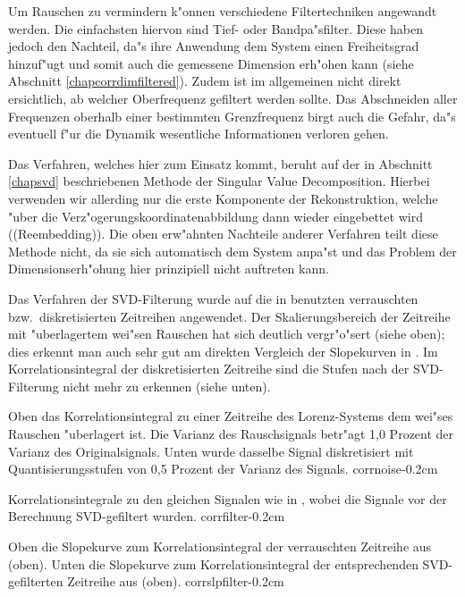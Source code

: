 Um Rauschen zu vermindern k"onnen verschiedene Filtertechniken angewandt werden. Die
einfachsten hiervon sind Tief- oder Bandpa"sfilter. Diese haben jedoch den Nachteil, da"s
ihre Anwendung dem System einen Freiheitsgrad hinzuf"ugt und somit auch die gemessene
Dimension erh"ohen kann (siehe Abschnitt \ref{chapcorrdimfiltered}). Zudem ist im
allgemeinen nicht direkt ersichtlich, ab welcher Oberfrequenz gefiltert werden sollte. Das
Abschneiden aller Frequenzen oberhalb einer bestimmten Grenzfrequenz birgt auch die
Gefahr, da"s eventuell f"ur die Dynamik wesentliche Informationen verloren gehen.

Das Verfahren, welches hier zum Einsatz kommt, beruht auf der in Abschnitt \ref{chapsvd}
beschriebenen Methode der Singular Value Decomposition. Hierbei verwenden wir allerding
nur die erste Komponente der Rekonstruktion, welche "uber die
Verz"ogerungskoordinatenabbildung dann wieder eingebettet wird (\begriff(Reembedding)).
Die oben erw"ahnten Nachteile 
anderer Verfahren teilt diese Methode nicht, da sie sich automatisch dem System anpa"st
und das Problem der Dimensionserh"ohung hier prinzipiell nicht auftreten kann.

Das Verfahren der SVD-Filterung wurde auf die in  benutzten verrauschten
bzw.\  diskretisierten Zeitreihen angewendet.
Der Skalierungsbereich der
Zeitreihe mit "uberlagertem wei"sen Rauschen hat sich deutlich vergr"o"sert (siehe 
oben); dies erkennt man auch sehr gut am direkten Vergleich der Slopekurven in
. Im Korrelationsintegral der diskretisierten Zeitreihe sind die
Stufen nach der SVD-Filterung nicht mehr zu erkennen (siehe  unten).


{Oben das Korrelationsintegral zu einer Zeitreihe des Lorenz-Systems dem wei"ses
Rauschen "uberlagert ist. Die Varianz des Rauschsignals betr"agt 1,0 Prozent der Varianz des
Originalsignals. Unten wurde dasselbe Signal diskretisiert mit Quantisierungsstufen von 0,5 Prozent
der Varianz des Signals.
}{corrnoise}{-0.2cm}


{Korrelationsintegrale zu den gleichen Signalen wie in , wobei die
  Signale vor der Berechnung SVD-gefiltert wurden.
}{corrfilter}{-0.2cm}

{Oben die Slopekurve zum Korrelationsintegral der verrauschten Zeitreihe aus
   (oben). Unten die Slopekurve zum Korrelationsintegral der entsprechenden
  SVD-gefilterten Zeitreihe aus  (oben).
}{corrslpfilter}{-0.2cm}



